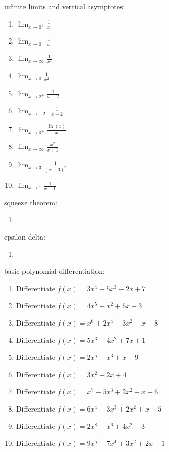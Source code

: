 \documentclass{article}
\begin{document}
infinite limits and vertical asymptotes:
\begin{enumerate}
        \item $\lim_{x \to 0^+} \frac{1}{x}$
        \item $\lim_{x \to 0^-} \frac{1}{x}$
        \item $\lim_{x \to \infty} \frac{1}{x^2}$
        \item $\lim_{x \to 0} \frac{1}{x^2}$
        \item $\lim_{x \to 2^+} \frac{1}{x-2}$
        \item $\lim_{x \to -2^-} \frac{1}{x+2}$
        \item $\lim_{x \to 0^+} \frac{\ln(x)}{x}$
        \item $\lim_{x \to \infty} \frac{x^2}{x+1}$
        \item $\lim_{x \to 3} \frac{1}{(x-3)^2}$
        \item $\lim_{x \to 1} \frac{1}{x-1}$
\end{enumerate}

squeeze theorem:
\begin{enumerate}
	\item
\end{enumerate}

epsilon-delta:
\begin{enumerate}
	\item
\end{enumerate}

basic polynomial differentiation:
\begin{enumerate}
        \item Differentiate $f(x) = 3x^4 + 5x^3 - 2x + 7$
        \item Differentiate $f(x) = 4x^5 - x^2 + 6x - 3$
        \item Differentiate $f(x) = x^6 + 2x^4 - 3x^2 + x - 8$
        \item Differentiate $f(x) = 5x^3 - 4x^2 + 7x + 1$
        \item Differentiate $f(x) = 2x^5 - x^3 + x - 9$
        \item Differentiate $f(x) = 3x^2 - 2x + 4$
        \item Differentiate $f(x) = x^7 - 5x^3 + 2x^2 - x + 6$
        \item Differentiate $f(x) = 6x^4 - 3x^3 + 2x^2 + x - 5$
        \item Differentiate $f(x) = 2x^8 - x^6 + 4x^2 - 3$
        \item Differentiate $f(x) = 9x^5 - 7x^4 + 3x^2 + 2x + 1$
\end{enumerate}
\end{document}
